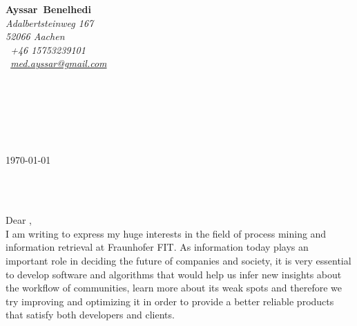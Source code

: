

\pagestyle{empty}


\setlength{\parindent}{0pt}
\addtolength{\parskip}{6pt}

\def\firstname{Ayssar}
\def\familyname{Benelhedi}
\def\FileAuthor{\firstname~\familyname}
\def\FileTitle{\firstname~\familyname's Bewerbungsschreiben}
\def\FileSubject{Bewerbungsschreiben}
\def\FileKeyWords{\firstname~\familyname, Bewerbungsschreiben}

\renewcommand{\ttdefault}{pcr}



\hypersetup{pdfborder=0 0 0}


\sffamily   %
\hfill%
\begin{minipage}[t]{.6\textwidth}
	\raggedleft%
	{\bfseries {\color{firstnamecolor}\firstname}~{\color{familynamecolor}\familyname}}\\[.35ex]
	\small\itshape%
	Adalbertsteinweg 167\\
	52066 Aachen\\[.35ex]
	\Mobilefone~+46 15753239101\\
	\Letter~\href{mailto:med.ayssar@gmail.com}{med.ayssar@gmail.com}
\end{minipage}\\[0.5em]
%
%
\begin{minipage}[t]{.4\textwidth}
	\raggedright%
	\vspace*{1em}
	\firmaContact\\[.20ex]
	\firmaName\\[.35ex]
	\small%
	\firmaStreet\\
	\firmaPlzCode
\end{minipage}
%
\hfill
%
\begin{minipage}[t]{.4\textwidth}
	\raggedleft %
	\today
\end{minipage}\\[1em]
\raggedright

{\bfseries \color{familynamecolor}\jobName}\\[1.5em]

Dear \contact, \\[1em]
%
I am writing to express my huge interests in the field of process mining and information retrieval at Fraunhofer FIT. As information today plays an important role in deciding the future of companies and society, it is very essential to develop software and algorithms that would help us infer new insights about the workflow of communities, learn more about its weak spots and therefore we try improving and optimizing it in order to provide a better reliable products that satisfy both developers and clients.

